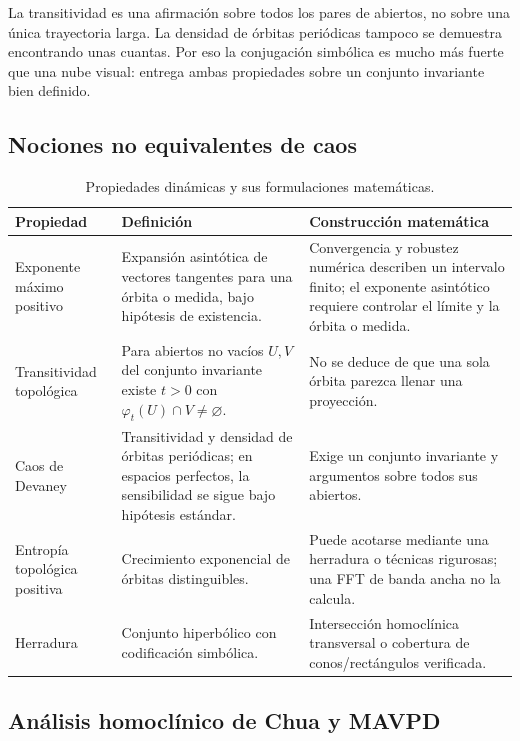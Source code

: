 La transitividad es una afirmación sobre todos los pares de abiertos, no sobre
una única trayectoria larga. La densidad de órbitas periódicas tampoco se
demuestra encontrando unas cuantas. Por eso la conjugación simbólica es mucho
más fuerte que una nube visual: entrega ambas propiedades sobre un conjunto
invariante bien definido.

\subsection{Nociones no equivalentes de caos}

\begin{table}[H]
\centering
\caption{Propiedades dinámicas y sus formulaciones matemáticas.}
\label{geo:tab:chaos-notions}
\small
\begin{tabularx}{\textwidth}{@{}L{0.20\textwidth}Y Y@{}}
\toprule
Propiedad & Definición & Construcción matemática \\
\midrule
Exponente máximo positivo & Expansión asintótica de vectores tangentes para
una órbita o medida, bajo hipótesis de existencia. & Convergencia y robustez
numérica describen un intervalo finito; el exponente asintótico requiere controlar el límite y la órbita o medida.
\\
Transitividad topológica & Para abiertos no vacíos \(U,V\) del conjunto
invariante existe \(t>0\) con \(\varphi_t(U)\cap V\ne\varnothing\). & No se
deduce de que una sola órbita parezca llenar una proyección. \\
Caos de Devaney & Transitividad y densidad de órbitas periódicas; en espacios
perfectos, la sensibilidad se sigue bajo hipótesis estándar. & Exige un
conjunto invariante y argumentos sobre todos sus abiertos. \\
Entropía topológica positiva & Crecimiento exponencial de órbitas
distinguibles. & Puede acotarse mediante una herradura o técnicas rigurosas;
una FFT de banda ancha no la calcula. \\
Herradura & Conjunto hiperbólico con codificación simbólica. & Intersección
homoclínica transversal o cobertura de conos/rectángulos verificada. \\
\bottomrule
\end{tabularx}
\end{table}

\subsection{Análisis homoclínico de Chua y MAVPD}

